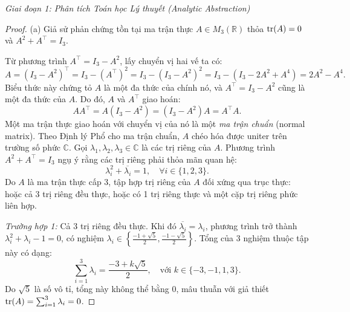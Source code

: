\documentclass{article}
\begin{document}
\vspace{0.5em}\noindent\emph{Giai đoạn 1: Phân tích Toán học Lý thuyết (Analytic Abstraction)}

\begin{proof}
	(a) Giả sử phản chứng tồn tại ma trận thực $A \in M_3(\mathbb{R})$ thỏa ${\rm tr}(A) = 0$ và $A^2 + A^\top = I_3$.
	
	Từ phương trình $A^\top = I_3 - A^2$, lấy chuyển vị hai vế ta có:
	\begin{equation*}
		A = (I_3 - A^2)^\top = I_3 - (A^\top)^2 = I_3 - (I_3 - A^2)^2 = I_3 - (I_3 - 2A^2 + A^4) = 2A^2 - A^4.
	\end{equation*}
	Biểu thức này chứng tỏ $A$ là một đa thức của chính nó, và $A^\top = I_3 - A^2$ cũng là một đa thức của $A$. Do đó, $A$ và $A^\top$ giao hoán:
	\begin{equation*}
		A A^\top = A(I_3 - A^2) = (I_3 - A^2)A = A^\top A.
	\end{equation*}
	Một ma trận thực giao hoán với chuyển vị của nó là một \emph{ma trận chuẩn} (normal matrix). Theo Định lý Phổ cho ma trận chuẩn, $A$ chéo hóa được uniter trên trường số phức $\mathbb{C}$. Gọi $\lambda_1, \lambda_2, \lambda_3 \in \mathbb{C}$ là các trị riêng của $A$. Phương trình $A^2 + A^\top = I_3$ ngụ ý rằng các trị riêng phải thỏa mãn quan hệ:
	\begin{equation*}
		\lambda_i^2 + \overline{\lambda_i} = 1, \quad \forall i \in \{1, 2, 3\}.
	\end{equation*}
	Do $A$ là ma trận thực cấp 3, tập hợp trị riêng của $A$ đối xứng qua trục thực: hoặc cả 3 trị riêng đều thực, hoặc có 1 trị riêng thực và một cặp trị riêng phức liên hợp.
	
	\emph{Trường hợp 1:} Cả 3 trị riêng đều thực. Khi đó $\overline{\lambda_i} = \lambda_i$, phương trình trở thành $\lambda_i^2 + \lambda_i - 1 = 0$, có nghiệm $\lambda_i \in \left\{ \frac{-1 + \sqrt{5}}{2}, \frac{-1 - \sqrt{5}}{2} \right\}$. Tổng của 3 nghiệm thuộc tập này có dạng:
	\begin{equation*}
		\sum_{i=1}^3 \lambda_i = \frac{-3 + k\sqrt{5}}{2}, \quad \text{với } k \in \{-3, -1, 1, 3\}.
	\end{equation*}
	Do $\sqrt{5}$ là số vô tỉ, tổng này không thể bằng 0, mâu thuẫn với giả thiết ${\rm tr}(A) = \sum_{i=1}^3 \lambda_i = 0$.
	

\end{proof}
\end{document}
